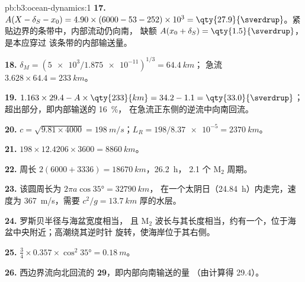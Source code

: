 \begin{solution}{pb:b3:ocean-dynamics:1}
\textbf{17.} $A(X - \delta_S - x_0) = 4.90\times(6000 - 53 - 252)\times
10^3 = \qty{27.9}{\sverdrup}$。紧贴边界的条带中，内部流动仍向南，
缺额 $A(x_0 + \delta_S) =
\qty{1.5}{\sverdrup}$，是本应穿过
该条带的内部输送量。

\textbf{18.} $\delta_M = (\num{5e3}/\num{1.875e-11})^{1/3} = \qty{64.4}{km}$；
急流 $3.628\times64.4 = \qty{233}{km}$。

\textbf{19.} $1.163\times29.4 - A\times\qty{233}{km} = 34.2 - 1.1 =
\qty{33.0}{\sverdrup}$；超出部分，即内部输送的 \qty{16}{\percent}，
在急流正东侧的逆流中向南回流。

\textbf{20.} $c = \sqrt{9.81\times4000} = \qty{198}{m/s}$；$L_R =
198/\num{8.37e-5} = \qty{2370}{km}$。

\textbf{21.} $198\times12.4206\times3600 = \qty{8860}{km}$。

\textbf{22.} 周长 $2(6000 + 3336) = \qty{18670}{km}$，\qty{26.2}{h}，
2.1 个 M$_2$ 周期。

\textbf{23.} 该圆周长为 $2\pi a\cos\ang{35} = \qty{32790}{km}$，
在一个太阴日（\qty{24.84}{h}）内走完，速度为 \qty{367}{m/s}，需要 $c^2/g =
\qty{13.7}{km}$ 厚的水层。

\textbf{24.} 罗斯贝半径与海盆宽度相当，
且 M$_2$ 波长与其长度相当，约有一个，位于海盆中央附近；高潮绕其逆时针
旋转，使海岸位于其右侧。

\textbf{25.} $\tfrac34\times0.357\times\cos^2\ang{35} = \qty{0.18}{m}$。

\textbf{26.} 西边界流向北回流的
\textbf{\qty[text-series-to-math=true]{29}{\sverdrup}}，即内部向南输送的量
（由计算得 \qty{29.4}{\sverdrup}）。
\end{solution}
